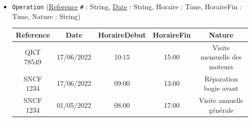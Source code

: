 \documentclass[11pt,a4paper,french,twoside]{PMCours}
\begin{document}
\begin{itemize}
\item \verb'Operation' (\underline{Reference} \verb'#' : String, \underline{Date} : String, Horaire : Time, HoraireFin : Time, Nature : String)
\begin{center}
\begin{tabular}{|c|c|c|c|c|}\hline
Reference & Date & HoraireDebut & HoraireFin & Nature\\\hline
QKT 78549 & 17/06/2022 & 10:15 & 15:00 & Visite mensuelle des moteurs\\\hline
SNCF 1234 & 17/06/2022 & 09:00 & 13:00 & Réparation bogie avant\\\hline
SNCF 1234 & 01/05/2022 & 08:00 & 17:00 & Visite annuelle générale\\\hline
\end{tabular}
\end{center}
\end{itemize}
\end{document}
